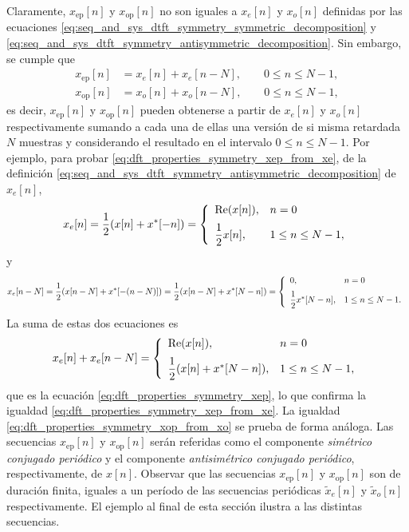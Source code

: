 \documentclass[a4paper]{report}
\renewcommand{\Re}{\operatorname{Re}}
\begin{document}
Claramente, \(x_\textrm{ep}[n]\) y \(x_\textrm{op}[n]\) no son iguales a \(x_e[n]\) y \(x_o[n]\) definidas por las ecuaciones \ref{eq:seq_and_sys_dtft_symmetry_symmetric_decomposition} y \ref{eq:seq_and_sys_dtft_symmetry_antisymmetric_decomposition}. Sin embargo, se cumple que 
\begin{align}
 x_\textrm{ep}[n]&=x_e[n]+x_e[n-N],\qquad 0\leq n\leq N-1,\label{eq:dft_properties_symmetry_xep_from_xe}\\
 x_\textrm{op}[n]&=x_o[n]+x_o[n-N],\qquad 0\leq n\leq N-1,\label{eq:dft_properties_symmetry_xop_from_xo}
\end{align}
es decir, \(x_\textrm{ep}[n]\) y \(x_\textrm{op}[n]\) pueden obtenerse a partir de \(x_e[n]\) y \(x_o[n]\) respectivamente sumando a cada una de ellas una versión de si misma retardada \(N\) muestras y considerando el resultado en el intervalo \(0\leq n\leq N-1\). Por ejemplo, para probar \ref{eq:dft_properties_symmetry_xep_from_xe}, de la definición \ref{eq:seq_and_sys_dtft_symmetry_antisymmetric_decomposition} de \(x_e[n]\),
\[
 x_e[n]=\frac{1}{2}(x[n]+x^*[-n])=
 \left\{ 
 \begin{array}{ll}
  \Re(x[n]),& n=0\\[\medskipamount]
  \dfrac{1}{2}x[n],& 1\leq n\leq N-1,
 \end{array}
 \right.
\]
y
\[
 x_e[n-N]=\frac{1}{2}(x[n-N]+x^*[-(n-N)])=\frac{1}{2}(x[n-N]+x^*[N-n])=
 \left\{ 
 \begin{array}{ll}
  0,& n=0\\[\medskipamount]
  \dfrac{1}{2}x^*[N-n],& 1\leq n\leq N-1.
 \end{array}
 \right.
\]
La suma de estas dos ecuaciones es
\[
 x_e[n]+x_e[n-N]=
 \left\{ 
 \begin{array}{ll}
  \Re(x[n]),& n=0\\[\medskipamount]
  \dfrac{1}{2}(x[n]+x^*[N-n]),& 1\leq n\leq N-1,
 \end{array}
 \right.
\]
que es la ecuación \ref{eq:dft_properties_symmetry_xep}, lo que confirma la igualdad \ref{eq:dft_properties_symmetry_xep_from_xe}. La igualdad \ref{eq:dft_properties_symmetry_xop_from_xo} se prueba de forma análoga. Las secuencias \(x_\textrm{ep}[n]\) y \(x_\textrm{op}[n]\) serán referidas como el componente \emph{simétrico conjugado periódico} y el componente \emph{antisimétrico conjugado periódico}, respectivamente, de \(x[n]\). Observar que las secuencias \(x_\textrm{ep}[n]\) y \(x_\textrm{op}[n]\) son de duración finita, iguales a un período de las secuencias periódicas \(\tilde{x}_e[n]\) y \(\tilde{x}_o[n]\) respectivamente. El ejemplo al final de esta sección ilustra a las distintas secuencias.
\end{document}
